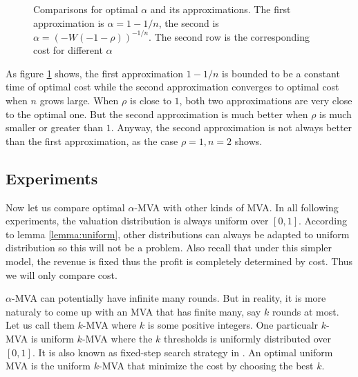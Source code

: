 \begin{figure}
  \caption{Comparisons for optimal  $\alpha$ and its approximations. The first
  approximation is $\alpha = 1-1/n$, the second is $\alpha =
  (-W(-1-\rho))^{-1/n}$. The second row is the corresponding cost for different
  $\alpha$} 
  \label{fig:alpha}
\end{figure}

As figure \ref{fig:alpha} shows, the first approximation $1-1/n$ is bounded
to be a constant time of optimal cost while the second approximation converges to optimal
cost when $n$ grows large. When $\rho$ is close to $1$, both two
approximations are very close to the optimal one. But the second approximation is much better
when $\rho$ is much smaller or greater than $1$. Anyway, the second approximation is not always
better than the first approximation, as the case $\rho = 1, n = 2$ shows.

\subsection{Experiments}\label{sec:eff_experiment}
Now let us compare optimal $\alpha$-MVA with other kinds of MVA. In all
following experiments, the valuation distribution is always uniform over $[0,
1]$. According to lemma \ref{lemma:uniform}, other distributions can always be
adapted to uniform distribution so this will not be a problem.  Also recall that
under this simpler model, the revenue is fixed thus the profit is
completely determined by cost. Thus we will only compare cost.

$\alpha$-MVA can potentially have infinite many rounds. But in reality, it is
more naturaly to come up with an MVA that has finite many, say $k$ rounds at
most. Let us call them $k$-MVA where $k$ is some positive integers. One
particualr $k$- MVA is uniform $k$-MVA where the $k$ thresholds is uniformly
distributed over $[0, 1]$.  It is also known as fixed-step search strategy in
\cite{SarneSR2010:IncreasingSearch, DBLP:conf/iwdc/HassanJ04}. An optimal uniform MVA is the uniform
$k$-MVA that minimize the cost by choosing the best $k$.

